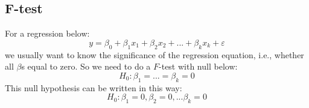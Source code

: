 \documentclass[12pt]{article}
\begin{document}
\begin{figure}[H]
\end{figure}



\begin{figure}[H]
\end{figure}










\subsection{F-test}
For a regression below:
\begin{equation*}
y = \beta_0 + \beta_1x_1 + \beta_2x_2 + ... + \beta_{k}x_{k} + \varepsilon
\end{equation*}
we usually want to know the significance of the regression equation, i.e., whether
all $ \beta $s equal to zero.
So we need to do a  $ F $-test with null below:
\begin{equation*}
H_0: \beta_1 = ... = \beta_{k} = 0
\end{equation*}
This null hypothesis can be written in this way:
\begin{equation*}
H_0: \beta_1 = 0, \beta_2 = 0, ... \beta_{k} = 0
\end{equation*}
\end{document}

